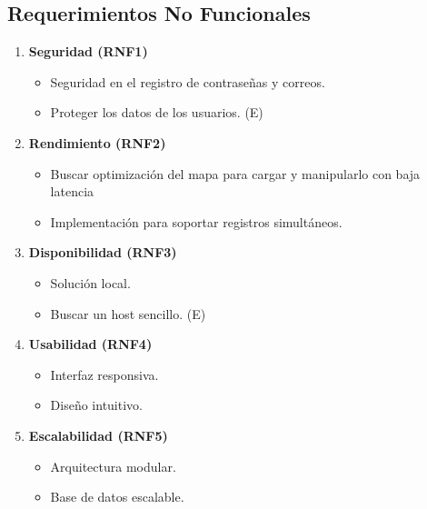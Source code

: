 \subsection*{Requerimientos No Funcionales}

\begin{enumerate}
    \item \textbf{Seguridad (RNF1)}
    \begin{itemize}
        \item Seguridad en el registro de contraseñas y correos.
        \item Proteger los datos de los usuarios. (E)        
    \end{itemize}

    \item \textbf{Rendimiento (RNF2)}
    \begin{itemize}
        \item Buscar optimización del mapa para cargar y manipularlo con baja latencia
        \item Implementación para soportar registros simultáneos.
    \end{itemize}

    \item \textbf{Disponibilidad (RNF3)}
    \begin{itemize}
        \item Solución local.
        \item Buscar un host sencillo.  (E)
    \end{itemize}

    \item \textbf{Usabilidad (RNF4)}
    \begin{itemize}
        \item Interfaz responsiva.
        \item Diseño intuitivo.
    \end{itemize}

    \item \textbf{Escalabilidad (RNF5)}
    \begin{itemize}
        \item Arquitectura modular.
        \item Base de datos escalable.
    \end{itemize}
\end{enumerate}